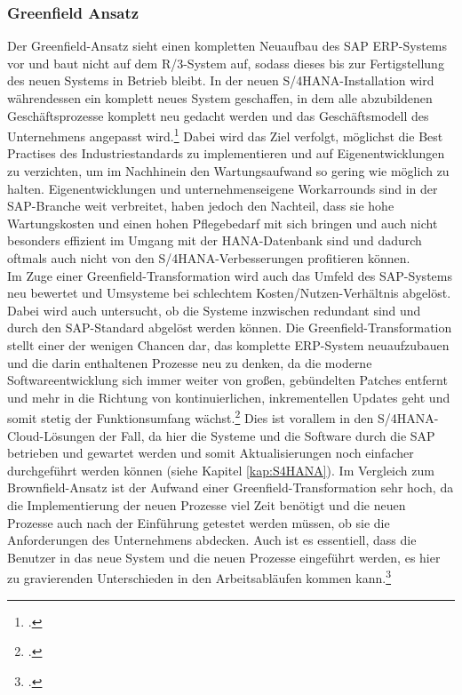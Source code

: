 \subsubsection{Greenfield Ansatz}
Der Greenfield-Ansatz sieht einen kompletten Neuaufbau des SAP ERP-Systems vor und baut nicht auf dem R/3-System auf, sodass dieses bis zur Fertigstellung des neuen Systems in Betrieb bleibt. In der neuen S/4HANA-Installation wird währendessen ein komplett neues System geschaffen, in dem alle abzubildenen Geschäftsprozesse komplett neu gedacht werden und das Geschäftsmodell des Unternehmens angepasst wird.\footcite[Vgl.][]{ao-blog} Dabei wird das Ziel verfolgt, möglichst die \glqq{}Best Practises\grqq{} des Industriestandards zu implementieren und auf Eigenentwicklungen zu verzichten, um im Nachhinein den Wartungsaufwand so gering wie möglich zu halten. Eigenentwicklungen und unternehmenseigene Workarrounds sind in der SAP-Branche weit verbreitet, haben jedoch den Nachteil, dass sie hohe Wartungskosten und einen hohen Pflegebedarf mit sich bringen und auch nicht besonders effizient im Umgang mit der HANA-Datenbank sind und dadurch oftmals auch nicht von den S/4HANA-Verbesserungen profitieren können.\\Im Zuge einer Greenfield-Transformation wird auch das Umfeld des SAP-Systems neu bewertet und Umsysteme bei schlechtem Kosten/Nutzen-Verhältnis abgelöst. Dabei wird auch untersucht, ob die Systeme inzwischen redundant sind und durch den SAP-Standard abgelöst werden können. Die Greenfield-Transformation stellt einer der wenigen Chancen dar, das komplette ERP-System neuaufzubauen und die darin enthaltenen Prozesse neu zu denken, da die moderne Softwareentwicklung sich immer weiter von großen, gebündelten Patches entfernt und mehr in die Richtung von kontinuierlichen, inkrementellen Updates geht und somit stetig der Funktionsumfang wächst.\footcite[Vgl.][]{gambit-transformation} Dies ist vorallem in den S/4HANA-Cloud-Lösungen der Fall, da hier die Systeme und die Software durch die SAP betrieben und gewartet werden und somit Aktualisierungen noch einfacher durchgeführt werden können (siehe Kapitel \ref{kap:S4HANA}). Im Vergleich zum Brownfield-Ansatz ist der Aufwand einer Greenfield-Transformation sehr hoch, da die Implementierung der neuen Prozesse viel Zeit benötigt und die neuen Prozesse auch nach der Einführung getestet werden müssen, ob sie die Anforderungen des Unternehmens abdecken. Auch ist es essentiell, dass die Benutzer in das neue System und die neuen Prozesse eingeführt werden, es hier zu gravierenden Unterschieden in den Arbeitsabläufen kommen kann.\footcite[Vgl.][]{gambit-transformation} 


